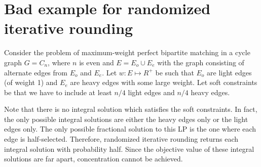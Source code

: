 \section{Bad example for randomized iterative rounding}\label{bad-example-for-rand-itr}
Consider the problem of maximum-weight perfect bipartite matching in a cycle graph $G=C_n$,
where $n$ is even and $E = E_o \cup E_e$ with the graph consisting of alternate edges
from $E_o$ and $E_e$.
Let $w: E \mapsto R^+$ be such that $E_o$ are light edges (of weight 1)
and $E_e$ are heavy edges with some large weight. Let soft constraints be
that we have to include at least $n/4$ light edges and $n/4$ heavy edges.

Note that there is no integral solution which satisfies the soft constraints.
In fact, the only possible integral solutions are either the heavy edges only or the light edges only.
The only possible fractional solution to this LP is the one where each edge is half-selected.
Therefore, randomized iterative rounding returns each integral solution with probability half.
Since the objective value of these integral solutions are far apart,
concentration cannot be achieved.
